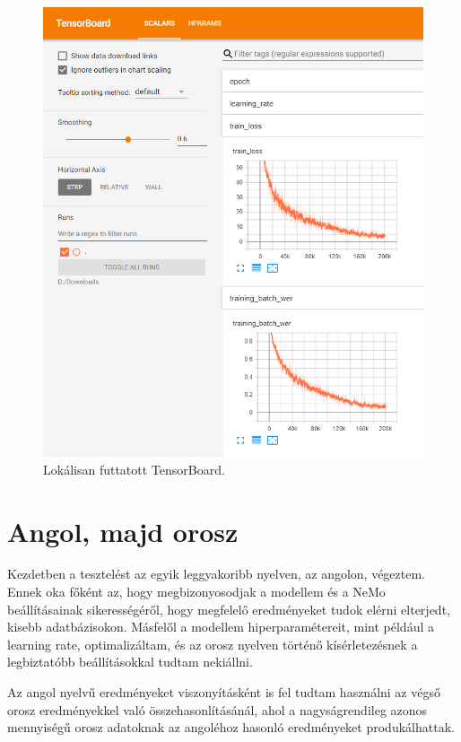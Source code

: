 \begin{figure}[!ht]
\centering
\includegraphics[width=150mm, keepaspectratio]{figures/tensorboard-example.png}
\caption{Lokálisan futtatott TensorBoard.}
\label{fig:TeXstudio}
\end{figure}

\section{Angol, majd orosz}

Kezdetben a tesztelést az egyik leggyakoribb nyelven, az angolon, végeztem. Ennek oka főként az, hogy megbizonyosodjak a modellem és a NeMo beállításainak sikerességéről, hogy megfelelő eredményeket tudok elérni elterjedt, kisebb adatbázisokon. Másfelől a modellem hiperparamétereit, mint például a learning rate, optimalizáltam, és az orosz nyelven történő kísérletezésnek a legbiztatóbb beállításokkal tudtam nekiállni.

Az angol nyelvű eredményeket viszonyításként is fel tudtam használni az végső orosz eredményekkel való összehasonlításánál, ahol a nagyságrendileg azonos mennyiségű orosz adatoknak az angoléhoz hasonló eredményeket produkálhattak.

